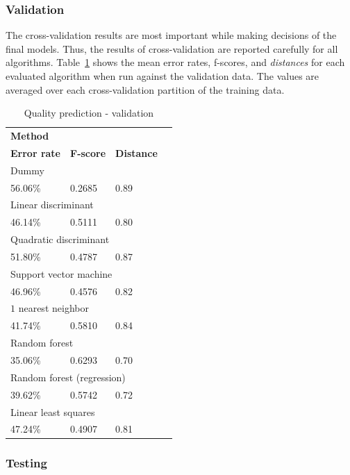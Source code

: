 \documentclass[twoside]{article}
\begin{document}
\begin{multicols}{2}
\subsubsection{Validation}

The cross-validation results are most important while making decisions of the final models. Thus, the results of cross-validation are reported carefully for all algorithms.
Table~\ref{table:quality_validation} shows the mean error rates, f-scores, and \emph{distances} for each evaluated algorithm when run against the validation data. The values are averaged over each
cross-validation partition of the training data.

\begin{table}[H]
\caption{Quality prediction - validation}
\label{table:quality_validation}
\centering
\begin{tabular}{llll}
\multicolumn{3}{l}{\textbf{Method}} \\
\textbf{Error rate} & \textbf{F-score} & \textbf{Distance} \\
\midrule
\multicolumn{3}{l}{Dummy} \\
56.06\% & 0.2685 & 0.89 \\
\multicolumn{3}{l}{Linear discriminant} \\
46.14\% & 0.5111 & 0.80 \\
\multicolumn{3}{l}{Quadratic discriminant} \\
51.80\% & 0.4787 & 0.87 \\
\multicolumn{3}{l}{Support vector machine} \\
46.96\% & 0.4576 & 0.82 \\
\multicolumn{3}{l}{$1$ nearest neighbor} \\
41.74\% & 0.5810 & 0.84 \\
\multicolumn{3}{l}{Random forest} \\
35.06\% & 0.6293 & 0.70 \\
\multicolumn{3}{l}{Random forest (regression)} \\
39.62\% & 0.5742 & 0.72 \\
\multicolumn{3}{l}{Linear least squares} \\
47.24\% & 0.4907 & 0.81 \\
\end{tabular}
\end{table}

\subsubsection{Testing}


\end{multicols}
\end{document}
